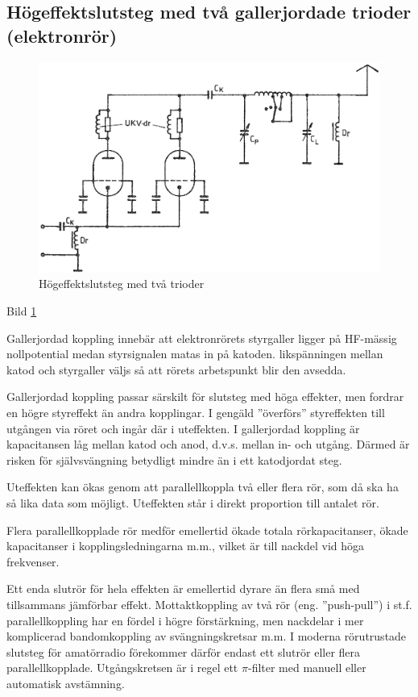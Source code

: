 \subsection{Högeffektslutsteg med två gallerjordade trioder (elektronrör)}

\begin{figure}
\includegraphics[width=\textwidth]{images/cropped_pdfs/bild_2_3-51.pdf}
\caption{Högeffektslutsteg med två trioder}
\label{fig:BildII3-51}
\end{figure}

Bild \ref{fig:BildII3-51}

Gallerjordad koppling innebär att elektronrörets styrgaller ligger på
HF-mässig nollpotential medan styrsignalen matas in på
katoden. likspänningen mellan katod och styrgaller väljs så att rörets
arbetspunkt blir den avsedda.

Gallerjordad koppling passar särskilt för slutsteg med höga effekter,
men fordrar en högre styreffekt än andra kopplingar. I gengäld
''överförs'' styreffekten till utgången via röret och ingår där i
uteffekten. I gallerjordad koppling är kapacitansen låg mellan katod
och anod, d.v.s. mellan in- och utgång. Därmed är risken för
självsvängning betydligt mindre än i ett katodjordat steg.

Uteffekten kan ökas genom att parallellkoppla två eller flera rör, som
då ska ha så lika data som möjligt. Uteffekten står i direkt
proportion till antalet rör.

Flera parallellkopplade rör medför emellertid ökade totala
rörkapacitanser, ökade kapacitanser i kopplingsledningarna m.m.,
vilket är till nackdel vid höga frekvenser.

Ett enda slutrör för hela effekten är emellertid dyrare än flera små
med tillsammans jämförbar effekt. Mottaktkoppling av två rör
(eng. ''push-pull'') i st.f. parallellkoppling har en fördel i högre
förstärkning, men nackdelar i mer komplicerad bandomkoppling av
svängningskretsar m.m. I moderna rörutrustade slutsteg för amatörradio
förekommer därför endast ett slutrör eller flera
parallellkopplade. Utgångskretsen är i regel ett \(\pi \)-filter med manuell
eller automatisk avstämning.

